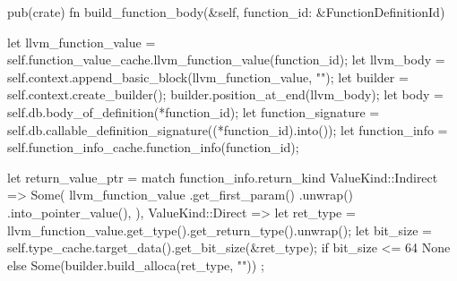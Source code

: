 \documentclass[
  oneside,
  english,
  coorientadorbanca,
  noabntexcite
]{ufsc-thesis-rn46-2019}
\begin{document}
\begin{rustcode}
{    pub(crate) fn build_function_body(&self, function_id: &FunctionDefinitionId) {
        let llvm_function_value = self.function_value_cache.llvm_function_value(function_id);
        let llvm_body = self.context.append_basic_block(llvm_function_value, "");
        let builder = self.context.create_builder();
        builder.position_at_end(llvm_body);
        let body = self.db.body_of_definition(*function_id);
        let function_signature = self.db.callable_definition_signature((*function_id).into());
        let function_info = self.function_info_cache.function_info(function_id);

        let return_value_ptr = match function_info.return_kind {
            ValueKind::Indirect => Some(
                llvm_function_value
                    .get_first_param()
                    .unwrap()
                    .into_pointer_value(),
            ),
            ValueKind::Direct => {
                let ret_type = llvm_function_value.get_type().get_return_type().unwrap();
                let bit_size = self.type_cache.target_data().get_bit_size(&ret_type);
                if bit_size <= 64 {
                    None
                } else {
                    Some(builder.build_alloca(ret_type, ""))
                }
            }
        };

}}
\end{rustcode}
\end{document}
